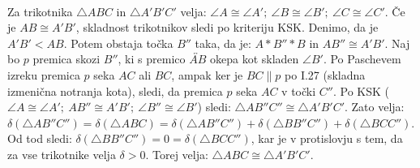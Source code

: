 \begin{dokaz}
            \\ Za trikotnika $\triangle ABC$ in $\triangle A'B'C'$ velja: $\angle A\cong \angle A';~\angle B\cong \angle B';~\angle C\cong \angle C'$.
            Če je $AB\cong A'B'$, skladnost trikotnikov sledi po kriteriju KSK.
            Denimo, da je $A'B'<AB$. Potem obstaja točka $B''$ taka, da je: $A\ast B''\ast B$ in $AB''\cong A'B'$. Naj bo $p$ premica skozi $B''$, ki s premico $\overleftrightarrow{AB}$ okepa kot skladen $\angle B'$. Po Paschevem izreku premica $p$ seka $AC$ ali $BC$, ampak ker je $BC\parallel p$ po I.27 (skladna izmenična notranja kota), sledi, da premica $p$ seka $AC$ v točki $C''$. Po KSK ($\angle A\cong\angle A';~AB''\cong A'B';~\angle B''\cong \angle B'$) sledi: $\triangle AB''C''\cong \triangle A'B'C'$. Zato velja: $\delta(\triangle AB''C'')=\delta(\triangle ABC)=\delta(\triangle AB''C'')+\delta(\triangle BB''C'')+\delta(\triangle BCC'')$. Od tod sledi: $\delta(\triangle BB''C'')=0=\delta(\triangle BCC'')$, kar je v protislovju s tem, da za vse trikotnike velja $\delta>0$. Torej velja: $\triangle ABC\cong\triangle A'B'C'$. 
        \end{dokaz}

